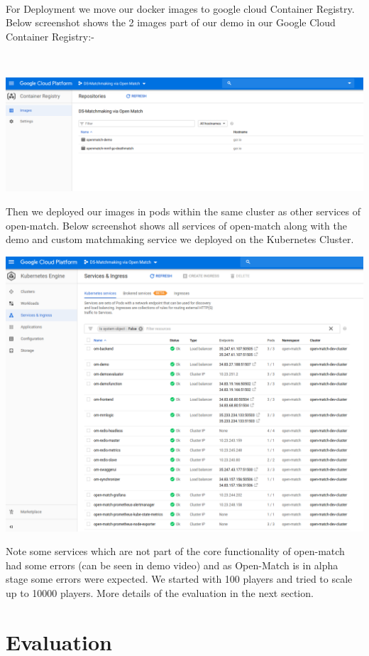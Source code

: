 \documentclass[12pt, letter]{article}
\begin{document}
\\

For Deployment we move our docker images to google cloud Container Registry. Below screenshot shows the 2 images part of our demo in our Google Cloud Container Registry:-

\\
\centerline{
   \includegraphics[width=1\textwidth]{images/uploadedImages.png}
}

Then we deployed our images in pods within the same cluster as other services of open-match. Below screenshot shows all services of open-match along with the demo and custom matchmaking service we deployed on the Kubernetes Cluster.

\centerline{
   \includegraphics[width=.8\textwidth]{images/deploy.png}
}

Note some services which are not part of the core functionality of open-match had some errors (can be seen in demo video) and as Open-Match is in alpha stage some errors were expected. We started with 100 players and tried to scale up to 10000 players. More details of the evaluation in the next section.

\section{Evaluation}
\end{document}
